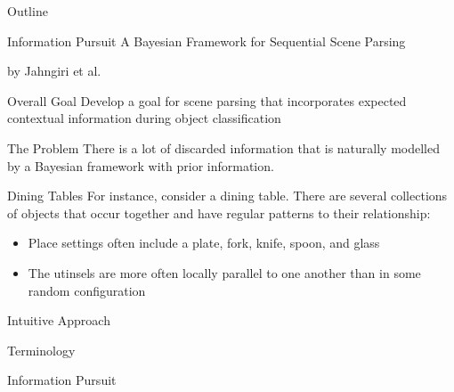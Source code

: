 \documentclass[presentation]{beamer}
\author{John Honaker}
\date{\today}
\title{}
\begin{document}
\begin{frame}{Outline}
\tableofcontents
\end{frame}


\begin{frame}[label={sec:orgbef001e}]{Information Pursuit}
A Bayesian Framework for Sequential Scene Parsing

by Jahngiri et al.

\begin{block}{Overall Goal}
Develop a goal for scene parsing that incorporates expected contextual information during object classification
\end{block}
\end{frame}

\begin{frame}[label={sec:org6f817b8}]{The Problem}
There is a lot of discarded information that is naturally modelled by a Bayesian framework with prior information.

\begin{block}{Dining Tables}
For instance, consider a dining table. There are several collections of objects that occur together and have regular patterns to their relationship:

\begin{itemize}
\item Place settings often include a plate, fork, knife, spoon, and glass
\item The utinsels are more often locally parallel to one another than in some random configuration
\end{itemize}
\end{block}
\end{frame}

\begin{frame}[label={sec:orgb24165b}]{Intuitive Approach}
\end{frame}

\begin{frame}[label={sec:org3255037}]{Terminology}
\end{frame}

\begin{frame}[label={sec:org3ecf7d8}]{Information Pursuit}
\end{frame}
\end{document}
